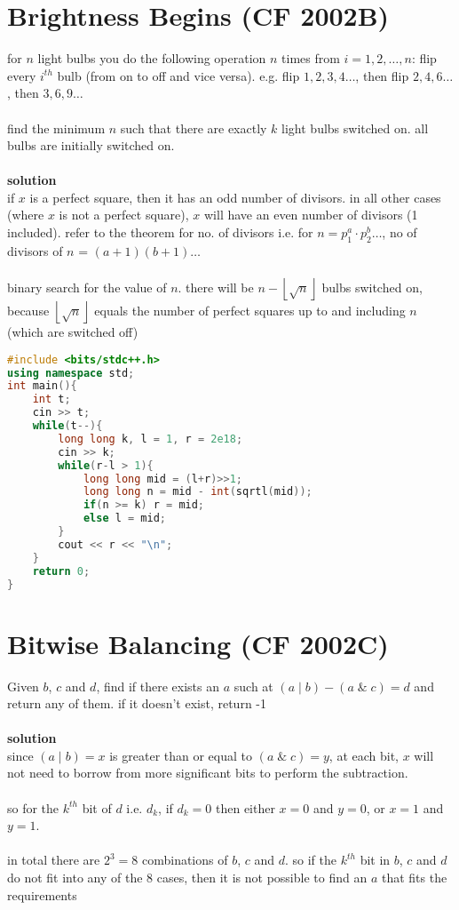 \documentclass[11pt]{article}
\newcommand{\br}{\\\;\\} %
\newcommand{\soln}{\textbf{solution}\\}
\begin{document}
\section{Brightness Begins (CF 2002B)}
for $n$ light bulbs you do the following operation $n$ times from $i = 1,2,\dots,n$: flip every $i^{th}$ bulb (from on to off and vice versa). e.g. flip $1, 2, 3, 4\dots$, then flip $2, 4, 6\dots$, then $3,6,9\dots$\br
find the minimum $n$ such that there are exactly $k$ light bulbs switched on. all bulbs are initially switched on.\br
\soln
if $x$ is a perfect square, then it has an odd number of divisors. in all other cases (where $x$ is not a perfect square), $x$ will have an even number of divisors (1 included). refer to the theorem for no. of divisors i.e. for $n = p_{1}^{a}\cdot p_{2}^{b} \dots $, no of divisors of $n$ = $(a+1)(b+1)\dots$\br binary search for the value of $n$. there will be $n-\left\lfloor\sqrt{n}\right\rfloor$ bulbs switched on, because $\left\lfloor\sqrt{n}\right\rfloor$ equals the number of perfect squares up to and including $n$ (which are switched off)

\begin{lstlisting}[language=C++]
#include <bits/stdc++.h>
using namespace std;
int main(){
    int t;
    cin >> t;
    while(t--){
        long long k, l = 1, r = 2e18;
        cin >> k;
        while(r-l > 1){
            long long mid = (l+r)>>1;
            long long n = mid - int(sqrtl(mid));
            if(n >= k) r = mid;
            else l = mid;
        }
        cout << r << "\n";
    }
    return 0;
}
\end{lstlisting}

\section{Bitwise Balancing (CF 2002C)}
Given $b$, $c$ and $d$, find if there exists an $a$ such at $(a\;|\;b)-(a\;\&\;c)=d$ and return any of them. if it doesn't exist, return -1\br

\soln
since $(a\;|\;b) = x$ is greater than or equal to $(a\;\&\;c) = y$, at each bit, $x$ will not need to borrow from more significant bits to perform the subtraction. \br so for the $k^{th}$ bit of $d$ i.e. $d_{k}$, if $d_{k} = 0$ then either $x = 0$ and $y = 0$, or $x = 1$ and $y = 1$. \br in total there are $2^{3} = 8$ combinations of $b$, $c$ and $d$. so if the $k^{th}$ bit in $b$, $c$ and $d$ do not fit into any of the 8 cases, then it is not possible to find an $a$ that fits the requirements
\end{document}
